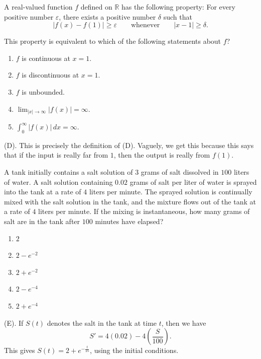 \begin{exercise}
A real-valued function $f$ defined on $\mathbb{R}$ has the following property: For 
every positive number $\varepsilon$, there exists a positive number $\delta$ such that
\[
|f(x)-f(1)|\geq\varepsilon
\qquad\text{whenever}\qquad
|x-1|\geq\delta.
\]

This property is equivalent to which of the following statements about $f$?

\begin{enumerate}[label=(\Alph*)]
    \item $f$ is continuous at $x=1$.
    \item $f$ is discontinuous at $x=1$.
    \item $f$ is unbounded.
    \item $\displaystyle \lim_{|x|\to\infty}|f(x)|=\infty$.
    \item $\displaystyle \int_0^\infty |f(x)|\,dx=\infty$.
\end{enumerate}
\end{exercise}
\begin{solution}
(D).  This is precisely the definition of (D). Vaguely, we get this because this says that 
if the input is really far from $1$, then the output is really from $f(1)$.
\end{solution}

\begin{exercise}
A tank initially contains a salt solution of $3$ grams of salt dissolved in $100$ liters of water.
A salt solution containing $0.02$ grams of salt per liter of water is sprayed into the tank at a rate 
of $4$ liters per minute. The sprayed solution is continually mixed with the salt solution in the tank, 
and the mixture flows out of the tank at a rate of $4$ liters per minute. If the mixing is instantaneous, 
how many grams of salt are in the tank after $100$ minutes have elapsed?
\begin{enumerate}[label=(\Alph*)]
    \item $2$
    \item $2-e^{-2}$
    \item $2+e^{-2}$
    \item $2-e^{-4}$
    \item $2+e^{-4}$
\end{enumerate}
\end{exercise}
\begin{solution}
(E). If $S(t)$ denotes the salt in the tank at time $t$, then we have
\[
S' = 4(0.02) - 4\left(\frac{S}{100}\right).
\]
This gives $S(t) = 2 + e^{-\frac{t}{25}}$, using the initial conditions.
\end{solution}

